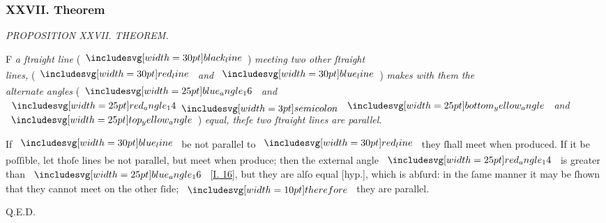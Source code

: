 \documentclass[12pt,preview]{standalone}
\begin{document}
\subsubsection{XXVII. Theorem}

\begin{minipage}[t]{0.33\textwidth}
    \vspace{40pt}
    
\end{minipage}%
\hfill
\begin{minipage}[t]{0.64\textwidth}
    \vspace{0pt}

    \begin{center}
        \textit{PROPOSITION XXVII. THEOREM.}\label{book1pr27} \\
    \end{center}

    \hfill

    \begin{center}
        \raggedright \lettrine[lines=4, loversize=1, nindent=0pt]{}{}F \textit{a ſtraight line} (\hspace{-1ex}$\blackline$\hspace{-1ex}) \textit{meeting two other ſtraight\\ lines,} (\hspace{-1ex}$\redline$ \textit{and} $\blueline$\hspace{-1ex}) \textit{makes with them the\\ alternate angles} (\hspace{-1ex}$\img{blue_angle_16}$ \textit{and} $\img{red_angle_14} \bsemicolon \img{bottom_yellow_angle}$ \textit{and}\\ $\img{top_yellow_angle}$\hspace{-1ex}) \textit{equal, theſe two ſtraight lines are parallel}.
    \end{center}

    \hfill

    \hfill

    \raggedright If $\blueline$ be not parallel to $\redline$ they ſhall meet when produced. If it be poſſible, let thoſe lines be not parallel, but meet when produce; then the external angle $\img{red_angle_14}$ is greater than $\img{blue_angle_16}$ [\hyperref[book1pr16]{\textsc{I.} 16}], but they are alſo equal [hyp.], which is abſurd: in the ſame manner it may be ſhown that they cannot meet on the other ſide; $\btherefore$ they are parallel.

    \hfill

    \hfill Q.E.D.
\end{minipage}
\end{document}
